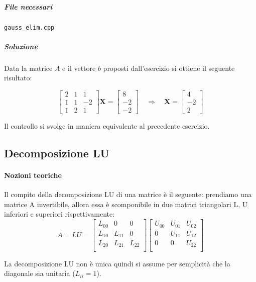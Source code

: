 \subparagraph{File necessari} \texttt{gauss\_elim.cpp}

\subparagraph{Soluzione} Data la matrice $A$ e il vettore $b$ proposti dall'esercizio si ottiene il seguente risultato:

$$
	\begin{bmatrix}
		2 & 1 & 1  \\
		1 & 1 & -2 \\
		1 & 2 & 1
	\end{bmatrix} \mathbf{X} = \begin{bmatrix}
		8 \\ -2 \\ -2 \end{bmatrix}
	\quad \Rightarrow \quad \mathbf{X} = \begin{bmatrix} 4 \\ -2 \\ 2 \end{bmatrix}
$$

Il controllo si svolge in maniera equivalente al precedente esercizio.


\subsection{Decomposizione LU}

\paragraph{Nozioni teoriche}

Il compito della decomposizione LU di una matrice è il seguente: prendiamo
una matrice A invertibile, allora essa è scomponibile in due matrici triangolari
L, U inferiori e superiori rispettivamente:
$$
	A = LU = \begin{bmatrix}
		L_{00} & 0      & 0      \\
		L_{10} & L_{11} & 0      \\
		L_{20} & L_{21} & L_{22} \\
	\end{bmatrix}
	\begin{bmatrix}
		U_{00} & U_{01} & U_{02} \\
		0      & U_{11} & U_{12} \\
		0      & 0      & U_{22} \\
	\end{bmatrix}
$$

La decomposizione LU non è unica quindi si assume per semplicità che la diagonale
sia unitaria ($L_{ii} = 1$).


